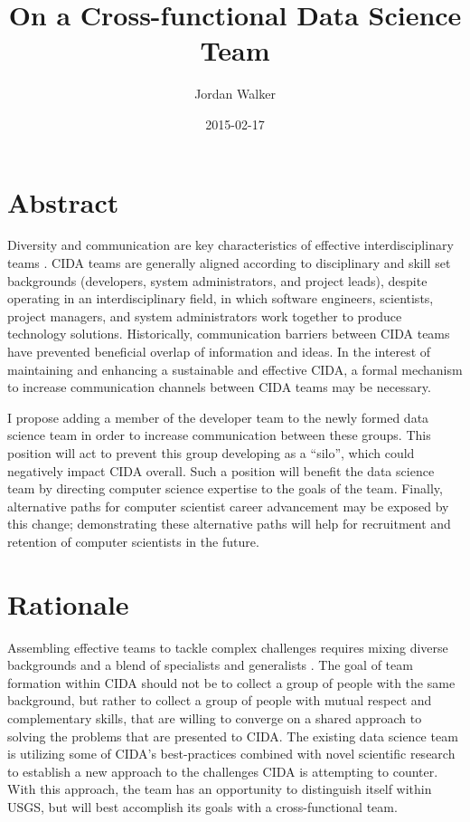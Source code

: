 \documentclass[twocolumn]{article}
\title{On a Cross-functional Data Science Team}
\author{Jordan Walker}
\date{2015-02-17}
\begin{document}
\maketitle
\section{Abstract}

Diversity and communication are key characteristics of effective interdisciplinary teams \cite{cheruvelil2014creating}.
CIDA teams are generally aligned according to disciplinary and skill set backgrounds (developers, system administrators, and project leads), despite operating in an interdisciplinary field, in which software engineers, scientists, project managers, and system administrators work together to produce technology solutions.
Historically, communication barriers between CIDA teams have prevented beneficial overlap of information and ideas.
In the interest of maintaining and enhancing a sustainable and effective CIDA, a formal mechanism to increase communication channels between CIDA teams may be necessary. 

\par
I propose adding a member of the developer team to the newly formed data science team in order to increase communication between these groups.
This position will act to prevent this group developing as a ``silo'', which could negatively impact CIDA overall.
Such a position will benefit the data science team by directing computer science expertise to the goals of the team.
Finally, alternative paths for computer scientist career advancement may be exposed by this change; demonstrating these alternative paths will help for recruitment and retention of computer scientists in the future.

\section{Rationale}

Assembling effective teams to tackle complex challenges requires mixing diverse backgrounds and a blend of specialists and generalists \cite{cheruvelil2014creating}.
The goal of team formation within CIDA should not be to collect a group of people with the same background, but rather to collect a group of people with mutual respect and complementary skills, that are willing to converge on a shared approach to solving the problems that are presented to CIDA.
The existing data science team is utilizing some of CIDA's best-practices combined with novel scientific research to establish a new approach to the challenges CIDA is attempting to counter.
With this approach, the team has an opportunity to distinguish itself within USGS, but will best accomplish its goals with a cross-functional team.
\end{document}
